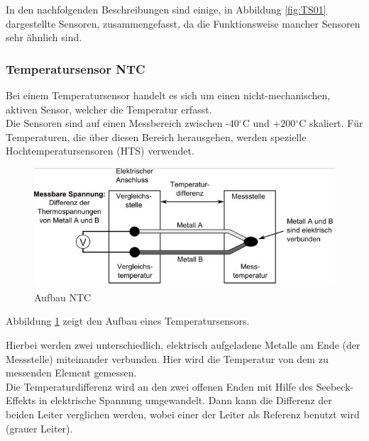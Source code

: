 \begin{flushleft}
\begin{itemize}
	        \end{itemize}
	
			In den nachfolgenden Beschreibungen sind einige, in Abbildung \ref{fig:TS01} dargestellte Sensoren, zusammengefasst, da die Funktionsweise mancher Sensoren sehr ähnlich sind.
			
	        \subsubsection{Temperatursensor NTC}
				Bei einem Temperatursensor handelt es sich um einen nicht-mechanischen, aktiven	Sensor, welcher die Temperatur erfasst.\\
	            Die Sensoren sind auf einen Messbereich zwischen -40$^\circ$C und +200$^\circ$C skaliert.
	            Für Temperaturen, die über diesen Bereich herausgehen, werden spezielle Hochtemperatursensoren (HTS) verwendet.
	
	            \begin{figure}[h]
				
		        	\includegraphics[width=\textwidth]{aufbau_ntc.png}
		            \caption[www.kfztech.de/kfztechnik/elo/sensoren/ntc.htm]{Aufbau NTC}
		            \label{fig:TS02}
	            
				\end{figure}
	
	            Abbildung \ref{fig:TS02} zeigt den Aufbau eines Temperatursensors.
	
	            Hierbei werden zwei unterschiedlich, elektrisch aufgeladene Metalle am Ende (der Messstelle) miteinander verbunden. Hier wird die Temperatur von dem zu messenden Element gemessen.\\
	            Die Temperaturdifferenz wird an den zwei offenen Enden mit Hilfe des Seebeck-Effekts in elektrische Spannung umgewandelt. 
	            Dann kann die Differenz der beiden Leiter verglichen werden, wobei einer der Leiter als Referenz benutzt wird (grauer Leiter).\cite{TS_temp} 
						

\end{flushleft}
